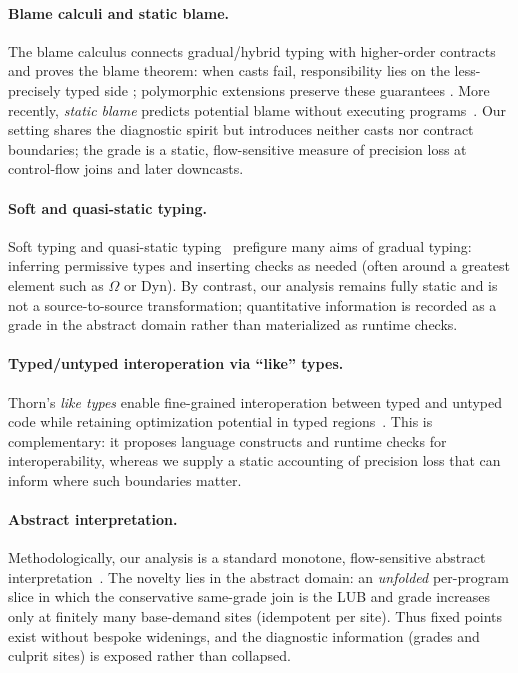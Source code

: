 \paragraph{Blame calculi and static blame.}
The blame calculus connects gradual/hybrid typing with higher-order contracts and proves the blame theorem: when casts fail, responsibility lies on the less-precisely typed side \cite{WadlerFindler2009}; polymorphic extensions preserve these guarantees \cite{AhmedFindlerSiekWadler2011}. More recently, \emph{static blame} predicts potential blame without executing programs~\cite{SuCulpepper2024}. Our setting shares the diagnostic spirit but introduces neither casts nor contract boundaries; the grade is a static, flow-sensitive measure of precision loss at control-flow joins and later downcasts.

\paragraph{Soft and quasi-static typing.}
Soft typing \cite{CartwrightFagan1991} and quasi-static typing~\cite{Thatte1990} prefigure many aims of gradual typing: inferring permissive types and inserting checks as needed (often around a greatest element such as $\Omega$ or \textsf{Dyn}). By contrast, our analysis remains fully static and is not a source-to-source transformation; quantitative information is recorded as a grade in the abstract domain rather than materialized as runtime checks.

\paragraph{Typed/untyped interoperation via ``like'' types.}
Thorn’s \emph{like types} enable fine-grained interoperation between typed and untyped code while retaining optimization potential in typed regions~\cite{WrigstadEtAl2010}. This is complementary: it proposes language constructs and runtime checks for interoperability, whereas we supply a static accounting of precision loss that can inform where such boundaries matter.

\paragraph{Abstract interpretation.}
Methodologically, our analysis is a standard monotone, flow-sensitive abstract interpretation~\cite{CousotCousot1977}. The novelty lies in the abstract domain: an \emph{unfolded} per-program slice in which the conservative same-grade join is the LUB and grade increases only at finitely many base-demand sites (idempotent per site). Thus fixed points exist without bespoke widenings, and the diagnostic information (grades and culprit sites) is exposed rather than collapsed.

